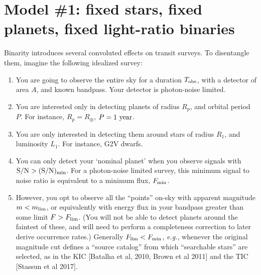 \documentclass{emulateapj}
\begin{document}
\section{Model \#1: fixed stars, fixed planets, fixed light-ratio binaries}
\label{sec:model_1}

Binarity introduces several convoluted effects on transit 
surveys. To disentangle them, imagine the following idealized survey:

\begin{enumerate}
\item You are going to observe the entire sky for a duration $T_{\rm obs}$, 
with a detector of area $A$, and known bandpass. Your detector is photon-noise 
limited.
%
\item You are interested only in detecting planets of radius $R_p$, and orbital 
period $P$. For instance, $R_p=R_\oplus$, $P={\rm 1\ year}$.
%
\item You are only interested in detecting them around stars of radius $R_1$, 
and luminosity $L_1$. For instance, G2V dwarfs.
%
\item You can only detect your `nominal planet' when you observe signals with
${\rm S/N} > {\rm (S/N)_{min}}$.
For a photon-noise limited survey, this minimum signal to noise ratio is 
equivalent to a minimum flux, $F_{\rm min}$.
%
\item However, you opt to observe all the ``points'' on-sky with apparent 
magnitude $m < m_{\rm lim}$, or equivalently with energy flux in your bandpass 
greater than some limit $F > F_{\rm lim}$.
(You will not be able to detect planets around the faintest of 
these, and will need to perform a completeness correction to later derive 
occurrence rates.)
Generally $F_{\rm lim} < F_{\rm min}$, \textit{e.g.}, whenever the original 
magnitude cut defines a ``source catalog'' from which ``searchable stars'' are 
selected, as in the KIC [Batalha et al, 2010, Brown et al 2011] and the TIC 
[Stassun et al 2017].
\end{enumerate}
\end{document}
